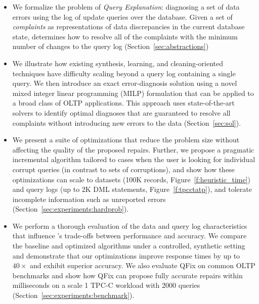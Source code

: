 \begin{itemize}[leftmargin=*, topsep=0mm, itemsep=0mm]

\item We formalize the problem of \emph{Query Explanation}: diagnosing a set of data errors using the log of update queries over the database.  Given a set of \emph{complaints} as representations of data discrepancies in the current database state, \sys determines how to resolve all of the complaints with the minimum number of changes to the query log (Section~\ref{sec:abstractions})

\item We illustrate how existing synthesis, learning, and cleaning-oriented techniques have difficulty scaling beyond a query log containing a single query.   We then introduce an exact error-diagnosis solution using a novel mixed integer linear programming (MILP) formulation that can be applied to a broad class of OLTP applications.  This approach uses state-of-the-art solvers to identify optimal diagnoses that are guaranteed to resolve all complaints without introducing new errors to the data (Section~\ref{sec:sol}).

\item We present a suite of optimizations that reduce the problem size without affecting the quality of the proposed repairs.  Further, we propose a pragmatic incremental algorithm tailored to cases when the user is looking for individual corrupt queries (in contrast to sets of corruptions), and show how these optimizations can scale to datasets (100K records, Figure~\ref{f:heuristic_time}) and query logs (up to 2K DML statements, Figure~\ref{f:tpcctatp}), and tolerate incomplete information such as unreported errors (Section~\ref{sec:experiments:hardprob}).

\item We perform a thorough evaluation of the data and query log characteristics that influence \sys's trade-offs between performance and accuracy.  We compare the baseline and optimized algorithms under a controlled, synthetic setting and demonstrate that our optimizations improve response times by up to $40\times$ and exhibit superior accuracy.   We also evaluate QFix on common OLTP benchmarks and show how QFix can propose fully accurate repairs within milliseconds on a scale 1 TPC-C workload with 2000 queries (Section~\ref{sec:experiments:benchmark}).

\end{itemize}
